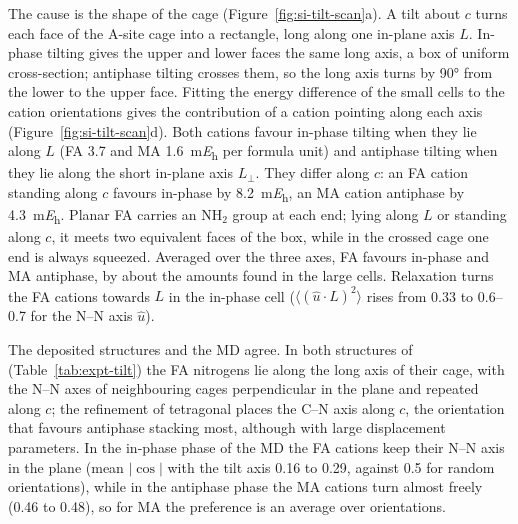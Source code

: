 {The cause is the shape of the cage (Figure~\ref{fig:si-tilt-scan}a). A tilt about $c$ turns each face of the A-site
cage into a rectangle, long along one in-plane axis $L$. In-phase tilting gives the upper and lower faces the same
long axis, a box of uniform cross-section; antiphase tilting crosses them, so the long axis turns by \ang{90} from the
lower to the upper face. Fitting the energy difference of the small cells to the cation orientations gives the
contribution of a cation pointing along each axis (Figure~\ref{fig:si-tilt-scan}d). Both cations favour in-phase
tilting when they lie along $L$ (FA 3.7 and MA \SI{1.6}{\milli\hartree} per formula unit) and antiphase tilting when they lie along the short in-plane axis $L_\perp$. They differ along $c$: an
FA cation standing along $c$ favours in-phase by \SI{8.2}{\milli\hartree}, an MA cation antiphase by
\SI{4.3}{\milli\hartree}. Planar FA carries an NH$_2$ group at each end; lying along $L$ or standing along $c$, it
meets two equivalent faces of the box, while in the crossed cage one end is always squeezed. Averaged over the three
axes, FA favours in-phase and MA antiphase, by about the amounts found in the large cells. Relaxation turns the FA
cations towards $L$ in the in-phase cell ($\langle (\hat u\cdot L)^2\rangle$ rises from 0.33 to 0.6--0.7 for the
N--N axis $\hat u$).

The deposited structures and the MD agree. In both structures of \FASnI{} (Table~\ref{tab:expt-tilt}) the FA
nitrogens lie along the long axis of their cage, with the N--N axes of neighbouring cages perpendicular in the plane and
repeated along $c$;\cite{Kahmann2020ACSEL} the refinement of tetragonal \MASnI{} places the C--N axis along
$c$,\cite{stoumpos2013semiconducting} the orientation that favours antiphase stacking most, although with large
displacement parameters. In the in-phase phase of the MD the FA cations keep their N--N axis in the plane (mean
$|\cos|$ with the tilt axis 0.16 to 0.29, against 0.5 for random orientations), while in the antiphase phase the MA
cations turn almost freely (0.46 to 0.48), so for MA the preference is an average over orientations.

}

